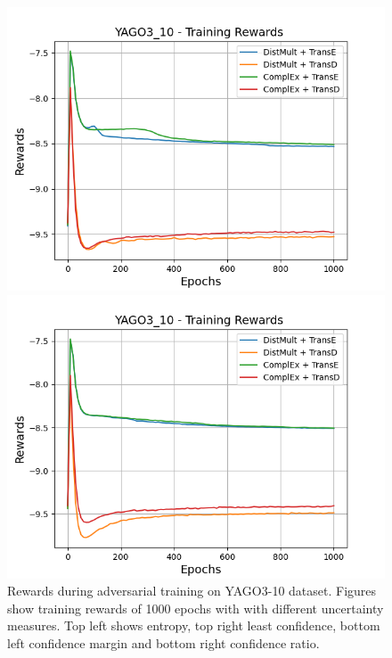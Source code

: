 \begin{figure}[H]
\begin{minipage}{.45\textwidth}
      \includegraphics[width=0.9\linewidth]{figures/results/gan_train/not_pretrained/uncertainty/max_distribution/confidence_margin/yago3_10/uncertainty_yago3_10_rew.png}
    \end{minipage}%
    \begin{minipage}{.45\textwidth}
      \centering
      \includegraphics[width=0.9\linewidth]{figures/results/gan_train/not_pretrained/uncertainty/max_distribution/confidence_ratio/yago3_10/uncertainty_yago3_10_rew.png}
    \end{minipage}%
    \caption{Rewards during adversarial training on \textsc{YAGO3-10} dataset. 
    Figures show training rewards of 1000 epochs with \ussoftmax with different uncertainty measures.
    Top left shows entropy, top right least confidence, 
    bottom left confidence margin and bottom right confidence ratio.}
    \label{fig:advtrain_metrics_yago3_10_rew}
\end{figure}